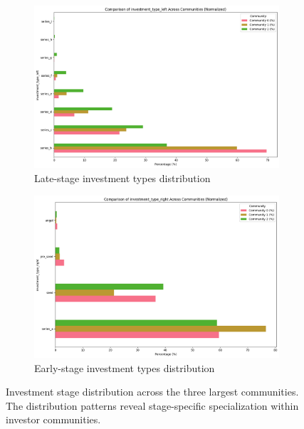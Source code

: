 \begin{figure}[htbp]
\centering
\begin{subfigure}{0.48\textwidth}
    \centering
    \includegraphics[width=\textwidth]{./assets/late-investment-types-distribution.png}
    \caption{Late-stage investment types distribution}
    \label{fig:late_stage_types}
\end{subfigure}
\hfill
\begin{subfigure}{0.48\textwidth}
    \centering
    \includegraphics[width=\textwidth]{./assets/early-investment-types-distribution.png}
    \caption{Early-stage investment types distribution}
    \label{fig:early_stage_types}
\end{subfigure}
\caption{Investment stage distribution across the three largest communities. The distribution patterns reveal stage-specific specialization within investor communities.}
\label{fig:investment_stage_distribution}
\end{figure}


